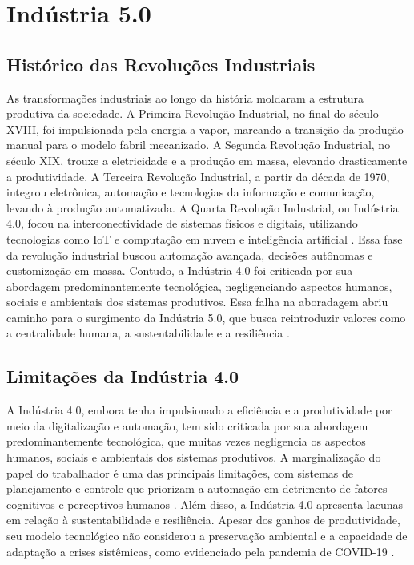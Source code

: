 
\chapter{Indústria 5.0}\label{cap:indutria5_0}
\section{Histórico das Revoluções Industriais}

As transformações industriais ao longo da história moldaram a estrutura produtiva da sociedade.
A Primeira Revolução Industrial, no final do século XVIII, foi impulsionada pela energia a vapor, marcando a transição da produção manual para o modelo fabril mecanizado.
A Segunda Revolução Industrial, no século XIX, trouxe a eletricidade e a produção em massa, elevando drasticamente a produtividade.
A Terceira Revolução Industrial, a partir da década de 1970, integrou eletrônica, automação e tecnologias da informação e comunicação, levando à produção automatizada.
A Quarta Revolução Industrial, ou Indústria 4.0, focou na interconectividade de sistemas físicos e digitais, utilizando tecnologias como \gls{IoT} e computação em nuvem e inteligência artificial \cite{VALETTE2023}.
Essa fase da revolução industrial buscou automação avançada, decisões autônomas e customização em massa.
Contudo, a Indústria 4.0 foi criticada por sua abordagem predominantemente tecnológica, negligenciando aspectos humanos, sociais e ambientais dos sistemas produtivos.
Essa falha na aboradagem abriu caminho para o surgimento da Indústria 5.0, que busca reintroduzir valores como a centralidade humana, a sustentabilidade e a resiliência \cite{Xu2021, PIZON2023}.

\section{Limitações da Indústria 4.0}

A Indústria 4.0, embora tenha impulsionado a eficiência e a produtividade por meio da digitalização e automação, tem sido criticada por sua abordagem predominantemente tecnológica, que muitas vezes negligencia os aspectos humanos, sociais e ambientais dos sistemas produtivos.
A marginalização do papel do trabalhador é uma das principais limitações, com sistemas de planejamento e controle que priorizam a automação em detrimento de fatores cognitivos e perceptivos humanos \cite{RANNERTSHAUSER2022}.
Além disso, a Indústria 4.0 apresenta lacunas em relação à sustentabilidade e resiliência. Apesar dos ganhos de produtividade, seu modelo tecnológico não considerou a preservação ambiental e a capacidade de adaptação a crises sistêmicas, como evidenciado pela pandemia de COVID-19 \cite{euCommission2021, Khan2023}.


